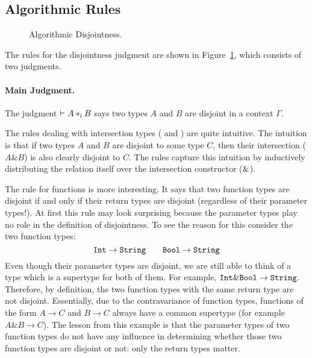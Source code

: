 \subsection{Algorithmic Rules}

\begin{figure}[h]


  \caption{Algorithmic Disjointness.}
  \label{fig:disjointness}
\end{figure}

The rules for the disjointness judgment are shown in
Figure~\ref{fig:disjointness}, which consists of two judgments.

\paragraph{Main Judgment.} The judgment $\vdash A *_\textnormal{i} B$ says
two types $A$ and $B$ are disjoint in a context
$\Gamma$.

The rules dealing with intersection types (
and ) are quite intuitive. The intuition is
that if two types $A$ and $B$ are disjoint to some type $C$, then
their intersection ($A\&B$) is also clearly disjoint to $C$.  The
rules capture this intuition by inductively distributing the relation
itself over the intersection constructor ($\&$).

The rule for functions  is more interesting. It says that two function
types are disjoint if and only if their return types are disjoint (regardless of
their parameter types!). At first this rule may look surprising
because the parameter types play no role in the definition of
disjointness. To see the reason for this consider the two function types:
\[ \texttt{Int} \to \texttt{String} \qquad \texttt{Bool} \to \texttt{String} \]
Even though their parameter types are disjoint, we are still able to think of a
type which is a supertype for both of them. For example, $ \texttt{Int} \& \texttt{Bool}
\to \texttt{String} $. Therefore, by definition, the two function types with
the same return type are not
disjoint. Essentially, due to the contravariance of function types,
functions of the form $A \to C$ and $B \to C$ always have a common
supertype (for example $A \& B \to C$).
The lesson from this example is that the parameter types of two
function types do not have any influence in determining whether those two function
types are disjoint or not: only the return types matter.

